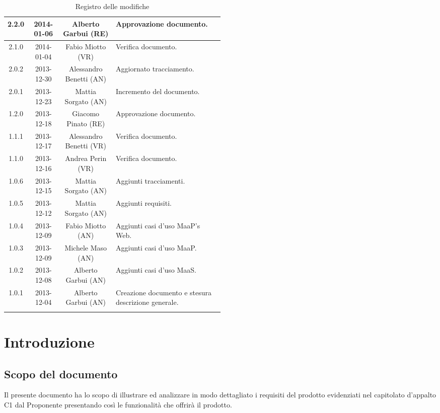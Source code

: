 \begin{center}
\begin{longtable}{|c|c|c|p{0.5\linewidth}|}
\midrule
2.2.0 & 2014-01-06 & Alberto Garbui (RE) & Approvazione documento.\\
\midrule
2.1.0 & 2014-01-04 & Fabio Miotto (VR) & Verifica documento.\\
\midrule
2.0.2 & 2013-12-30 & Alessandro Benetti (AN) & Aggiornato tracciamento.\\
\midrule
2.0.1 & 2013-12-23 & Mattia Sorgato (AN) & Incremento del documento.\\

\midrule
1.2.0 & 2013-12-18 & Giacomo Pinato (RE) & Approvazione documento.\\
\midrule
1.1.1 & 2013-12-17 & Alessandro Benetti (VR) & Verifica documento.\\
\midrule
1.1.0 & 2013-12-16 & Andrea Perin (VR) & Verifica documento.\\
\midrule
1.0.6 & 2013-12-15 & Mattia Sorgato (AN) & Aggiunti tracciamenti.\\
\midrule
1.0.5 & 2013-12-12 & Mattia Sorgato (AN) & Aggiunti requisiti.\\
\midrule
1.0.4 & 2013-12-09 & Fabio Miotto (AN) & Aggiunti casi d'uso MaaP's Web.\\
\midrule
1.0.3 & 2013-12-09 & Michele Maso (AN) & Aggiunti casi d'uso MaaP.\\
\midrule
1.0.2 & 2013-12-08 & Alberto Garbui (AN) & Aggiunti casi d'uso MaaS.\\
\midrule
1.0.1 & 2013-12-04 & Alberto Garbui (AN) & Creazione documento e stesura descrizione generale.\\

\bottomrule
\caption{Registro delle modifiche}
\label{tab:changelog}
\end{longtable}
\end{center}

\newpage
\tableofcontents

\newpage
\listoftables
\listoffigures

\newpage
\section{Introduzione}%
\subsection{Scopo del documento}%
Il presente documento ha lo scopo di illustrare ed analizzare in modo dettagliato i requisiti del prodotto  evidenziati nel capitolato d'appalto C1 dal Proponente \Prop{} presentando così le funzionalità che offrirà il prodotto.

